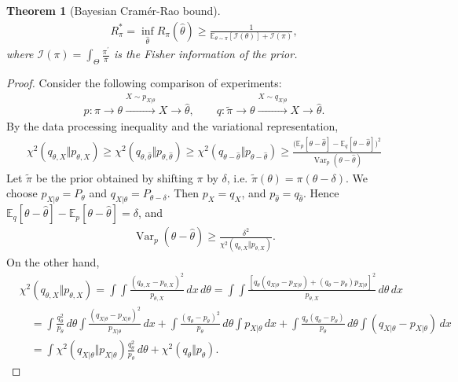 \documentclass{article}
\numberwithin{equation}{section}
\newcommand{\E}{\mathbb{E}}
\renewcommand{\cal}{\mathcal}
\newcommand{\wh}{\widehat}
\newcommand{\wt}{\widetilde}
\DeclareMathOperator{\var}{Var}
\theoremstyle{plain}
\newtheorem{theorem}{Theorem}[section]
\theoremstyle{definition}
\begin{document}
\begin{theorem}[Bayesian Cramér-Rao bound]
\begin{align*}
	R_\pi^*=\inf_{\wh{\theta}}R_\pi(\wh\theta)\geq\frac{1}{\E_{\theta\sim\pi}[\cal{I}(\theta)]+\cal{I}(\pi)},
\end{align*}
where $\cal{I}(\pi)=\int_{\Theta}\frac{\pi^\prime}{\pi}$ is the Fisher information of the prior.
\end{theorem}
\begin{proof}
Consider the following comparison of experiments:
\begin{align*}
p:\pi\to\theta\overset{X\sim p_{X|\theta}}{\xrightarrow{\hspace{1cm}}} X\to\wh{\theta},\qquad q:\wt\pi\to\theta\overset{X\sim q_{X|\theta}}{\xrightarrow{\hspace{1cm}}} X\to\wh{\theta}.
\end{align*}
By the data processing inequality and the variational representation,
\begin{align*}
	\chi^2(q_{\theta,X}\Vert p_{\theta,X})\geq\chi^2(q_{\theta,\wh\theta}\Vert p_{\theta,\wh\theta})\geq\chi^2(q_{\theta-\wh\theta}\Vert p_{\theta-\wh\theta})\geq\frac{\bigl(\E_p[\theta-\wh\theta]-\E_q[\theta-\wh\theta]\bigr)^2}{\var_p(\theta-\wh\theta)}
\end{align*}
Let $\wt\pi$ be the prior obtained by shifting $\pi$ by $\delta$, i.e. $\wt{\pi}(\theta)=\pi(\theta-\delta)$. We choose $p_{X|\theta}=P_\theta$ and $q_{X|\theta}=P_{\theta-\delta}$. Then $p_X=q_X$, and $p_{\wh\theta}=q_{\wh\theta}$. Hence $\E_q[\theta-\wh\theta]-\E_p[\theta-\wh\theta]=\delta$, and
\begin{align}
	\var_p(\theta-\wh\theta)\geq\frac{\delta^2}{\chi^2(q_{\theta,X}\Vert p_{\theta,X})}.\label{baysianhcr}
\end{align} 
On the other hand,
\begin{align*}
	&\chi^2(q_{\theta,X}\Vert p_{\theta,X})=\int\int\frac{(q_{\theta,X}-p_{\theta,X})^2}{p_{\theta,X}}\,dx\,d\theta=\int\int\frac{\left[q_\theta(q_{X|\theta}-p_{X|\theta})+(q_\theta-p_\theta)p_{X|\theta}\right]^2}{p_{\theta,X}}\,d\theta\,dx\\
	&\quad =\int\frac{q_\theta^2}{p_\theta}\,d\theta\int\frac{(q_{X|\theta}-p_{X|\theta})^2}{p_{X|\theta}}\,dx+\int\frac{(q_\theta-p_\theta)^2}{p_\theta}\,d\theta\int p_{X|\theta}\,dx+\int\frac{q_\theta(q_\theta-p_\theta)}{p_\theta}\,d\theta\int(q_{X|\theta}-p_{X|\theta})\,dx\\
	&\quad=\int\chi^2(q_{X|\theta}\Vert p_{X|\theta})\frac{q_\theta^2}{p_\theta}\,d\theta+\chi^2(q_\theta\Vert p_\theta).

\end{align*}
\end{proof}
\end{document}
